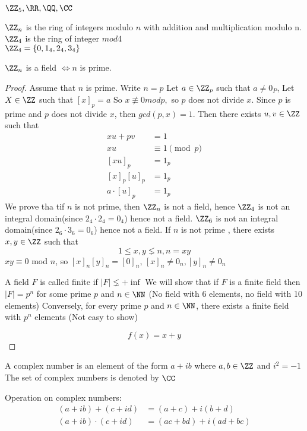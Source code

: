 \documentclass[11pt]{scrartcl}
\begin{document}
\begin{example}
	$\ZZ_5, \RR, \QQ, \CC$
\end{example}
\begin{example}
	$\ZZ_n$ is the ring of integers modulo $n$ with addition and multiplication modulo n.\\
	$\ZZ_4$ is the ring of integer $mod 4$\\
	$\ZZ_4 = \{0, 1_4, 2_4, 3_4\}$
\end{example}
\begin{proposition}
	$\ZZ_n$ is a field $\iff n$ is prime.\\
\end{proposition}
\begin{proof}
	Assume that $n$ is prime. Write $n = p$
	Let $a \in \ZZ_p$ such that $a \neq 0_P$, Let $X \in \ZZ$ such that $[x]_p = a$
	So $x \not\equiv 0 mod p,$ so $p$ does not divide $x$.
	Since $p$ is prime and $p$ does not divide $x$, then $gcd(p, x) = 1$.
	Then there exists $u, v \in \ZZ$ such that 
	\begin{align*}
		xu + pv &= 1\\
		xu &\equiv 1 \pmod p\\
		[xu]_p &= 1_p\\
		[x]_p[u]_p &= 1_p\\
		a\cdot [u]_p &= 1_p
	\end{align*}
	We prove tha tif $n$ is not prime, then $\ZZ_n$ is not a field, hence $\ZZ_4$ is not an integral domain(since $2_4 \cdot 2_4 = 0_4$) hence not a field. $\ZZ_6$ is not an integral domain(since $2_6\cdot 3_6 = 0_6$) hence not a field.
	If $n$ is not prime , there exists$x, y \in \ZZ$ such that 
	\[1 \leq x, y \lneq n, n = xy\]
	$xy \equiv 0$ mod $n$, so $[x]_n [y]_n = [0]_n$, $[x]_n \neq 0_n, [y]_n \neq 0_n$
	\begin{itemize}
		\ii
		A field $F$ is called finite if $|F| \lneq +\inf$
		\ii
		We will show that if $F$ is a finite field then $|F| = p^n$ for some prime $p$ and $n \in \NN$
		(No field with 6 elements, no field with 10 elements)
		\ii
		Conversely, for every prime $p$ and $n \in \NN$, there exists a finite field with $p^n$ elements (Not easy to show)
	\end{itemize}
	\[
	f(x) = x + y
	\]
\end{proof}
\begin{definition}
		A complex number is an element of the form $a+ib$ where $a, b \in \ZZ$ and $i^2 = -1$\\
		The set of complex numbers is denoted by $\CC$\\
\end{definition}
\begin{example}
	Operation on complex numbers:
		\begin{align*}
			(a+ ib) + (c + id) &= (a + c) + i(b + d)\\
			(a +ib) \cdot (c + id) &= (ac + bd) + i(ad + bc)
		\end{align*}
\end{example}
\clearpage
\end{document}
